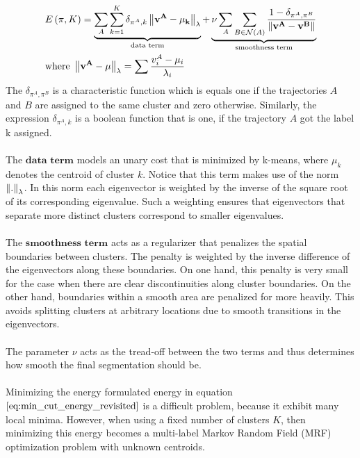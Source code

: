 \begin{equation}
\begin{aligned}
& E \left( \pi, K \right) = \underbrace{\sum_{A} \sum_{k=1}^K \delta_{\pi^A, k} \left\lVert\bf{v}^A - \mu_k\right\rVert_{\lambda}}_\text{data term} + \underbrace{\nu \sum_A \sum_{B \in \mathcal{N}(A)} \frac{1- \delta_{\pi^A, \pi^B}}{\left\lVert\bf{v}^A - \bf{v}^B\right\rVert}}_\text{smoothness term} \\
& \text{where } \left\lVert\bf{v}^A - \bf{\mu}\right\rVert_\lambda = \sum \frac{v_i^A -  \mu_i}{\lambda_i}
\end{aligned} 
\label{eq:min_cut_energy_revisited}
\end{equation}
The $\delta_{\pi^A, \pi^B}$ is a characteristic function which is equals one if the trajectories $A$ and $B$ are assigned to the same cluster and zero otherwise. Similarly, the expression $\delta_{\pi^A, k}$ is a boolean function that is one, if the trajectory $A$ got the label k assigned. \\ \\
The $\textbf{data term}$ models an unary cost that is minimized by k-means, where $\mu_k$ denotes the centroid of cluster $k$. Notice that this term makes use of the norm $\left\lVert.\right\rVert_{\lambda}$. In this norm each eigenvector is weighted by the inverse of the square root of its corresponding eigenvalue. Such a weighting ensures that eigenvectors that separate more distinct clusters correspond to smaller eigenvalues. \\ \\
The $\textbf{smoothness term}$ acts as a regularizer that penalizes the spatial boundaries between clusters. The penalty is weighted by the inverse difference of the eigenvectors along these boundaries. On one hand, this penalty is very small for the case when there are clear discontinuities along cluster boundaries. On the other hand, boundaries within a smooth area are penalized for more heavily. This avoids splitting clusters at arbitrary locations due to smooth transitions in the eigenvectors. \\ \\
The parameter $\nu$ acts as the tread-off between the two terms and thus determines how smooth the final segmentation should be. \\ \\
Minimizing the energy formulated energy in equation $\ref{eq:min_cut_energy_revisited}$ is a difficult problem, because it exhibit many local minima. However, when using a fixed number of clusters $K$, then minimizing this energy becomes a multi-label Markov Random Field (MRF) optimization problem with unknown centroids. \\ \\
